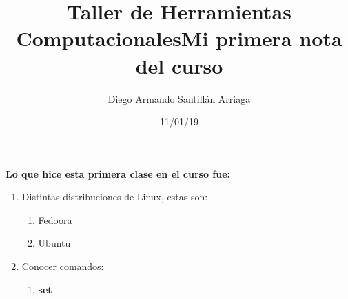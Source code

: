 \documentclass[letterpaper, 12pt, oneside]{article}%
\title{\Huge Taller de Herramientas Computacionales}
\author{Diego Armando Santillán Arriaga}
\date{11/01/19}
\begin{document}
	\maketitle
	\newpage
    \title{\Huge Mi primera nota del curso}
    
    \textbf{Lo que hice esta primera clase en el curso fue:}
    \begin{enumerate}
    	\item Distintas distribuciones de Linux, estas son:
    	\begin{enumerate}
    		\item Fedoora
    		\item Ubuntu    		
    	\end{enumerate}
    \item Conocer comandos:
    \begin{enumerate}
    	\item \color{green}\textbf{set}
    	
    \end{enumerate}
    \end{enumerate}
\end{document}
